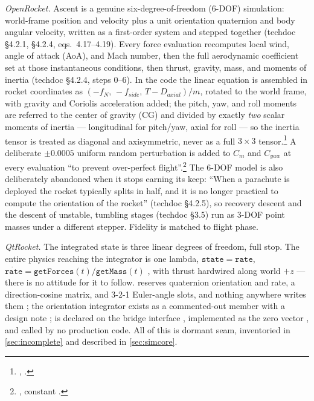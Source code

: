 \emph{OpenRocket.} Ascent is a genuine six-degree-of-freedom (6-DOF) simulation: world-frame
position and velocity plus a unit orientation quaternion and body angular velocity, written
as a first-order system and stepped together (techdoc \S 4.2.1, \S 4.2.4, eqs.~4.17--4.19).
Every force evaluation recomputes local wind, angle of attack (AoA), and Mach number, then
the full aerodynamic coefficient set at those instantaneous conditions, then thrust,
gravity, mass, and moments of inertia (techdoc \S 4.2.4, steps 0--6). In the code the linear
equation is assembled in rocket coordinates as $(-f_N,\,-f_{side},\,T-D_{axial})/m$, rotated
to the world frame, with gravity and Coriolis acceleration added; the pitch, yaw, and roll
moments are referred to the center of gravity (CG) and divided by exactly \emph{two} scalar
moments of inertia --- longitudinal for pitch/yaw, axial for roll --- so the inertia tensor
is treated as diagonal and axisymmetric, never as a full $3\times 3$
tensor.\footnote{,
.} A deliberate $\pm 0.0005$ uniform random perturbation is
added to $C_m$ and $C_{yaw}$ at every evaluation ``to prevent over-perfect
flight''.\footnote{, constant .}
The 6-DOF model is also deliberately abandoned when it stops earning its keep: ``When a
parachute is deployed the rocket typically splits in half, and it is no longer practical to
compute the orientation of the rocket'' (techdoc \S 4.2.5), so recovery descent and the
descent of unstable, tumbling stages (techdoc \S 3.5) run as 3-DOF point masses under a
different stepper. Fidelity is matched to flight phase.

\emph{QtRocket.} The integrated state is three linear degrees of freedom, full stop. The
entire physics reaching the integrator is one lambda,
$\dot{\mathtt{state}} = \mathtt{rate}$,
$\dot{\mathtt{rate}} = \mathtt{getForces}(t)/\mathtt{getMass}(t)$
, with thrust hardwired along world $+z$
 --- there is no attitude for it to follow.
 reserves quaternion orientation and rate, a direction-cosine matrix, and
3-2-1 Euler-angle slots, and nothing anywhere writes them ; the
orientation integrator exists as a commented-out member with a design note
;  is declared on the bridge interface
, implemented as the zero vector
, and called by no production code. All of this is dormant
seam, inventoried in \cref{sec:incomplete} and described in \cref{sec:simcore}.

